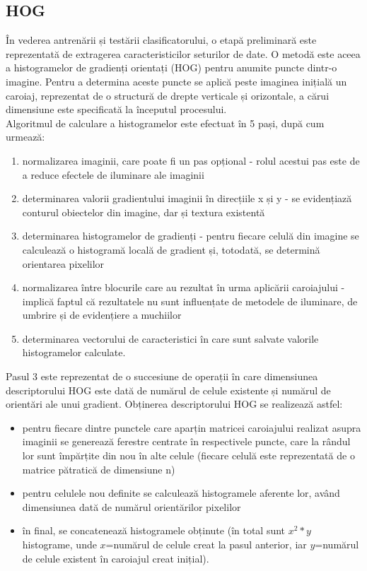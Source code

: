 \documentclass[a4paper,12pt]{report}
\newcommand\tab[1][1cm]{\hspace*{#1}}
\begin{document}
\subsection {HOG}
\tab În vederea antrenării și testării clasificatorului, o etapă preliminară este reprezentată de extragerea caracteristicilor seturilor de date. O metodă este aceea a histogramelor de gradienți orientați (HOG)\cite{opencv3} pentru anumite puncte dintr-o imagine. 
Pentru a determina aceste puncte se aplică peste imaginea inițială un caroiaj, reprezentat de o structură de drepte verticale și orizontale, a cărui dimensiune este specificată la începutul procesului. 
\\ \tab Algoritmul de calculare a histogramelor este efectuat în 5 pași, după cum urmează:
\begin{enumerate}
\setlength\itemsep{1pt}
\item normalizarea imaginii, care poate fi un pas opțional - rolul acestui pas este de a reduce efectele de iluminare ale imaginii
\item determinarea valorii gradientului imaginii în direcțiile x și y - se evidențiază conturul obiectelor din imagine, dar și textura existentă
\item determinarea histogramelor de gradienți - pentru fiecare celulă din imagine se calculează o histogramă locală de gradient și, totodată, se determină orientarea pixelilor 
\item normalizarea între blocurile care au rezultat în urma aplicării caroiajului - implică faptul că rezultatele nu sunt influențate de metodele de iluminare, de umbrire și de evidențiere a muchiilor 
\item determinarea vectorului de caracteristici în care sunt salvate valorile histogramelor calculate.
\end{enumerate}
\tab Pasul 3 este reprezentat de o succesiune de operații în care dimensiunea descriptorului HOG este dată de numărul de celule existente și numărul de orientări ale unui gradient. Obținerea descriptorului HOG se realizează astfel:
\begin{itemize}
\setlength\itemsep{1pt}
\item pentru fiecare dintre punctele care aparțin matricei caroiajului realizat asupra imaginii se generează ferestre centrate în respectivele puncte, care la rândul lor sunt împărțite din nou în alte celule (fiecare celulă este reprezentată de o matrice pătratică de dimensiune n)
\item pentru celulele nou definite se calculează histogramele aferente lor, având dimensiunea dată de numărul orientărilor pixelilor
\item în final, se concatenează histogramele obținute (în total sunt $x^2*y$ histograme, unde $x$=numărul de celule creat la pasul anterior, iar $y$=numărul de celule existent în caroiajul creat inițial).
\end{itemize}
\end{document}
